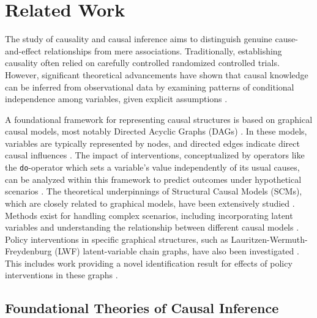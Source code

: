 
\section{Related Work}
\label{sec:relaeted_work}

The study of causality and causal inference aims to distinguish genuine cause-and-effect relationships from mere associations. Traditionally, establishing causality often relied on carefully controlled randomized controlled trials. However, significant theoretical advancements have shown that causal knowledge can be inferred from observational data by examining patterns of conditional independence among variables, given explicit assumptions \cite{pearl2018theoretical}.

A foundational framework for representing causal structures is based on graphical causal models, most notably Directed Acyclic Graphs (DAGs) \cite{verma1986causal, pearl1988probabilistic, Glymour2019Review, koller2009probabilistic}. In these models, variables are typically represented by nodes, and directed edges indicate direct causal influences \cite{pearl1988probabilistic}. The impact of interventions, conceptualized by operators like the \texttt{do}-operator which sets a variable's value independently of its usual causes, can be analyzed within this framework to predict outcomes under hypothetical scenarios \cite{pearl1988probabilistic, Pearl2009Causality}. The theoretical underpinnings of Structural Causal Models (SCMs), which are closely related to graphical models, have been extensively studied \cite{pearl2000causality, Peters2017Elements, bareinboim2020causal, janzing2016algorithmic, Peters2022Causal}. Methods exist for handling complex scenarios, including incorporating latent variables \cite{Mohan2021Graphical, Mohan2017Graphical, richardson2003causal} and understanding the relationship between different causal models \cite{Verma1990Equivalence, pearl2018theoretical}. Policy interventions in specific graphical structures, such as Lauritzen-Wermuth-Freydenburg (LWF) latent-variable chain graphs, have also been investigated \cite{sherman2020general}. This includes work providing a novel identification result for effects of policy interventions in these graphs \cite{sherman2020general}.

\subsection{Foundational Theories of Causal Inference}
\label{subsec:foundational_theories}

